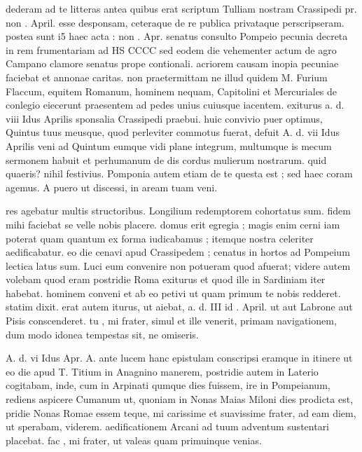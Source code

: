 


 dederam ad te litteras antea quibus erat scriptum Tulliam nostram Crassipedi pr. non . April. esse desponsam, ceteraque de re publica privataque perscripseram. postea sunt i5 haec acta : non . Apr. senatus consulto Pompeio pecunia decreta in rem frumentariam ad HS CCCC sed eodem die vehementer actum de agro Campano clamore senatus prope contionali. acriorem causam inopia pecuniae faciebat et annonae caritas. non praetermittam ne illud quidem M. Furium Flaccum, equitem Romanum, hominem nequam, Capitolini et Mercuriales de conlegio eiecerunt praesentem ad pedes unius cuiusque iacentem. exiturus a. d. viii Idus Aprilis sponsalia Crassipedi praebui. huic convivio puer optimus, Quintus tuus meusque, quod perleviter commotus fuerat, defuit A. d. vii Idus Aprilis veni ad Quintum eumque vidi plane integrum, multumque is mecum sermonem habuit et perhumanum de dis cordus mulierum nostrarum. quid quaeris? nihil festivius. Pomponia autem etiam de te questa est ; sed haec coram agemus. A puero ut discessi, in aream tuam veni.

 res agebatur multis structoribus. Longilium redemptorem cohortatus sum. fidem mihi faciebat se velle nobis placere. domus erit egregia ; magis enim cerni iam poterat quam quantum ex forma iudicabamus ; itemque nostra celeriter aedificabatur. eo die cenavi apud Crassipedem ; cenatus in hortos ad Pompeium lectica latus sum. Luci eum convenire non potueram quod afuerat; videre autem volebam quod eram postridie Roma exiturus et quod ille in Sardiniam iter habebat. hominem conveni et ab eo petivi ut quam primum te nobis redderet. statim dixit. erat autem iturus, ut aiebat, a. d. III id . April. ut aut Labrone aut Pisis conscenderet. tu , mi frater, simul et ille venerit, primam navigationem, dum modo idonea tempestas sit, ne omiseris.

 A. d. vi Idus Apr. A. ante lucem hanc epistulam conscripsi eramque in itinere ut eo die apud T. Titium in Anagnino manerem, postridie autem in Laterio cogitabam, inde, cum in Arpinati qumque dies fuissem, ire in Pompeianum, rediens aspicere Cumanum ut, quoniam in Nonas Maias Miloni dies prodicta est, pridie Nonas Romae essem teque, mi carissime et suavissime frater, ad eam diem, ut sperabam, viderem. aedificationem Arcani ad tuum adventum sustentari placebat. fac , mi frater, ut valeas quam primuinque venias.
